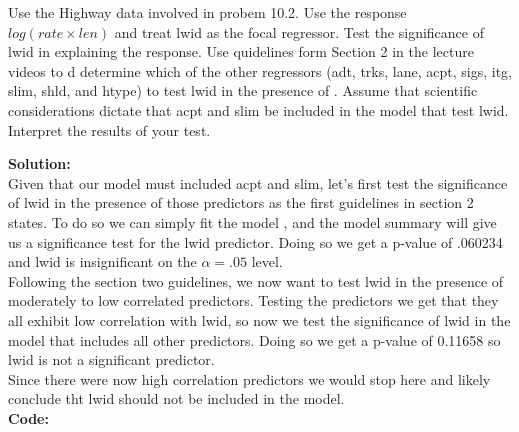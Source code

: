 \documentclass[12pt]{article}
\makeatletter
\theoremstyle{homework}
\newenvironment{exercise}[1]
{\def\@currentlabel{#1}\exercisecore}
{\endexercisecore}
\newcommand{\localhead}[1]{\par\smallskip\noindent\textbf{#1}\nobreak\\}%
\newcommand\solution{\localhead{Solution:}}
\makeatother
\begin{document}
\begin{exercise}{1}Use the Highway data involved in probem 10.2. Use the response $log(rate \times len)$ and treat lwid as the 
  focal regressor. Test the significance of lwid in explaining the response. Use quidelines form Section 2 in the lecture videos to d
  determine which of the other regressors (adt, trks, lane, acpt, sigs, itg, slim, shld, and htype) to test lwid in the presence of . Assume
  that scientific considerations dictate that acpt and slim be included in the model that test lwid. Interpret the results of your test. \\

  \solution Given that our model must included acpt and slim, let's first test the significance of lwid in the presence of those predictors 
  as the first guidelines in section 2 states. To do so we can simply fit the model , and the model summary will give us a significance test for 
  the lwid predictor. Doing so we get a p-value of .060234 and lwid is insignificant on the $\alpha = .05$ level. \\
  Following the section two guidelines, we now want to test lwid in the presence of moderately to low correlated predictors. Testing the predictors we get that 
  they all exhibit low correlation with lwid, so now we test the significance of lwid in the model that includes all other predictors. Doing so we get a p-value of 
  0.11658 so lwid is not a significant predictor. \\
  Since there were now high correlation predictors we would stop here and likely conclude tht lwid should not be included in the model. \\

 \textbf{Code:}
 \begin{center}
 
 \end{center} 
\end{exercise}
\newpage
\end{document}
